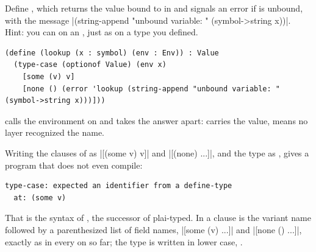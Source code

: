 \begin{exercise}
Define , which returns the value bound to  in  and signals an error if  is unbound, with the message \rkt|(string-append "unbound variable: " (symbol->string x))|. Hint: you can  on an , just as on a type you defined.
\end{exercise}
\begin{solution}
\begin{lstlisting}
(define (lookup (x : symbol) (env : Env)) : Value
  (type-case (optionof Value) (env x)
    [some (v) v]
    [none () (error 'lookup (string-append "unbound variable: " (symbol->string x)))]))
\end{lstlisting}
 calls the environment on  and takes the answer apart:  carries the value,  means no layer recognized the name.
\end{solution}

\begin{pitfall}
Writing the clauses of  as \rkt|[(some v) v]| and \rkt|[(none) ...]|, and the type as , gives a program that does not even compile:
\begin{lstlisting}[style=repl]
type-case: expected an identifier from a define-type
  at: (some v)
\end{lstlisting}
That is the syntax of , the successor of plai-typed. In  a clause is the variant name followed by a parenthesized list of field names, \rkt|[some (v) ...]| and \rkt|[none () ...]|, exactly as in every  on  so far; the type is written in lower case, .
\end{pitfall}

